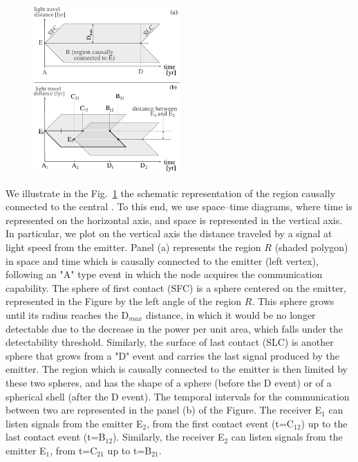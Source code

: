 \begin{figure}[!t]
   \centering
   \includegraphics[width=0.5\textwidth]{F_scheme.pdf}
    \label{F_scheme}
\end{figure}



       


 We illustrate in the Fig.~\ref{F_scheme} the schematic
representation of the region causally connected to the central
\ceti{}.
%
To this end, we use space--time diagrams, where time is represented on
the horizontal axis, and space is represented in the vertical axis.
%
In particular, we plot on the vertical axis the distance traveled by
a signal at light speed from the emitter.
%
Panel (a) represents the region $R$ (shaded polygon) in space and time
which is causally connected to the emitter (left vertex), following an
"A" type event in which the node acquires the communication
capability.
%
The sphere of first contact (SFC) is a sphere centered on the emitter,
represented in the Figure by the left angle of the region $R$.
%
This sphere grows until its radius reaches the D$_{max}$ distance, in
which it would be no longer detectable due to the decrease in the
power per unit area, which falls under the detectability threshold.
%
Similarly, the surface of last contact (SLC) is another sphere that
grows from a "D" event and carries the last signal produced by the
emitter.
%
The region which is causally connected to the emitter is then limited
by these two spheres, and has the shape of a sphere (before the D
event) or of a spherical shell (after the D event).
%
The temporal intervals for the communication between two \cetis{} are
represented in the panel (b) of the Figure.
%
The receiver \ceti{} E$_1$ can listen signals from the emitter \ceti{}
E$_2$, from the first contact event (t=C$_{12}$) up to the last
contact event (t=B$_{12}$).
%
Similarly, the receiver \ceti{} E$_2$ can listen signals from the
emitter \ceti{} E$_1$, from t=C$_{21}$ up to t=B$_{21}$.


